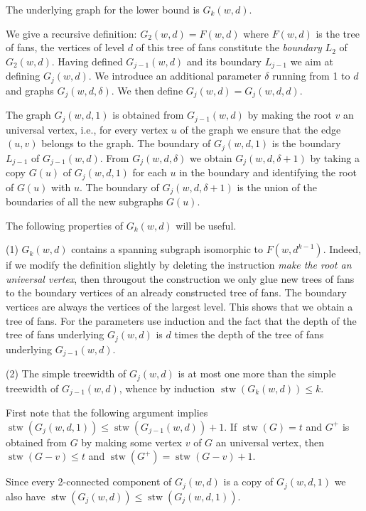 \documentclass[11pt]{article}
\begin{document}
The underlying graph for the lower bound is $G_k(w,d)$.

We give a recursive definition: $G_2(w,d) = F(w,d)$ where $F(w,d)$ is the tree
of fans, the vertices of level $d$ of this tree of fans constitute the
\emph{boundary} $L_2$ of $G_2(w,d)$.  Having defined $G_{j-1}(w,d)$ and its
boundary $L_{j-1}$ we aim at defining  $G_j(w,d)$.  We introduce an
additional parameter $\delta$ running from 1 to $d$ and graphs
$G_j(w,d,\delta)$. We then define $G_j(w,d)= G_j(w,d,d)$.

The graph $G_j(w,d,1)$ is obtained from $G_{j-1}(w,d)$ by making the root $v$
an universal vertex, i.e., for every vertex $u$ of the graph we ensure that the edge
$(u,v)$ belongs to the graph.  The boundary of $G_j(w,d,1)$ is the boundary
$L_{j-1}$ of $G_{j-1}(w,d)$.  From $G_j(w,d,\delta)$ we obtain
$G_j(w,d,\delta+1)$ by taking a copy $G(u)$ of $G_j(w,d,1)$ for each $u$ in
the boundary and identifying the root of $G(u)$ with $u$. The boundary of
$G_j(w,d,\delta+1)$ is the union of the boundaries of all the new subgraphs
$G(u)$.


The following properties of $G_k(w,d)$ will be useful.

\noindent (1) $G_k(w,d)$ contains a spanning subgraph isomorphic to
$F(w,d^{k-1})$.  Indeed, if we modify the definition slightly by deleting the
instruction \emph{make the root an universal vertex}, then througout the construction we only glue new
trees of fans to the boundary vertices of an already constructed tree of fans.
The boundary vertices are always the vertices of the largest level. This shows
that we obtain a tree of fans. For the parameters use induction and the fact that
the depth of the tree of fans underlying $G_j(w,d)$ is $d$ times
the depth of the tree of fans underlying $G_{j-1}(w,d)$.

\noindent (2) The simple treewidth of $G_j(w,d)$ is at most one more
than the simple treewidth of $G_{j-1}(w,d)$, whence  by induction $\operatorname{stw}(G_k(w,d)) \leq k$.

First note that the following argument implies $\operatorname{stw}(G_j(w,d,1)) \leq \operatorname{stw}(G_{j-1}(w,d))+1$.
If $\operatorname{stw}(G) = t$ and $G^+$ is obtained from $G$ by making some vertex
$v$ of $G$ an universal vertex,
then $\operatorname{stw}(G-v) \leq t$ and $\operatorname{stw}(G^+) = \operatorname{stw}(G-v) + 1$.

Since every 2-connected component of $G_j(w,d)$ is a copy of $G_j(w,d,1)$ we also
have $\operatorname{stw}(G_j(w,d)) \leq \operatorname{stw}(G_j(w,d,1))$.
\end{document}
